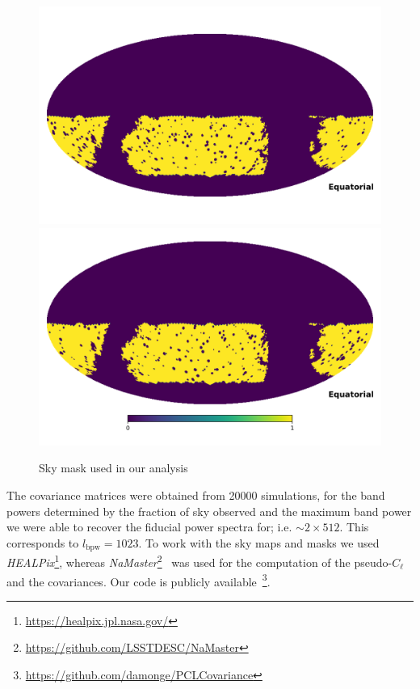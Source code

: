 \documentclass[a4paper,11pt]{article}
\newcommand{\cl}{C_\ell}
\begin{document}
\begin{figure}
  \centering
  \includegraphics[width=\columnwidth]{./figures/mask-lss1.png}\\
  \includegraphics[width=\columnwidth]{./figures/mask-lss2.png}
  \caption{Sky mask used in our analysis}
  \label{fig:mask}
\end{figure}

The covariance matrices were obtained from 20000 simulations, for the band
powers determined by the fraction of sky observed and the maximum band power
we were able to recover the fiducial power spectra for; i.e. $\sim 2 \times
512$. This corresponds to $l_{\mbox{bpw}} = 1023$. To work with the sky
maps and masks we used
\textit{HEALPix}\footnote{\url{https://healpix.jpl.nasa.gov/}}, whereas 
\textit{NaMaster}\footnote{\url{https://github.com/LSSTDESC/NaMaster}}~\cite{2018arXiv180909603A}
was used for the computation of the pseudo-$\cl$ and the covariances. Our code
is publicly
available~\footnote{\url{https://github.com/damonge/PCLCovariance}}.
\end{document}
